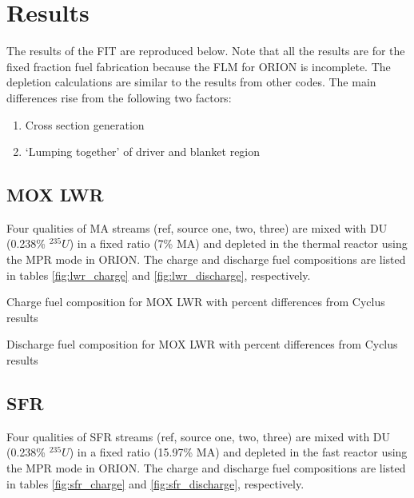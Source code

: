 \documentclass{article}
\begin{document}
\section{Results}
The results of the \gls{FIT} are reproduced below. Note that all the results are for the fixed fraction
fuel fabrication because the \gls{FLM} for ORION is incomplete. The depletion calculations are similar to the
results from other codes. The main differences rise from the following two factors:

\begin{enumerate}
    \item Cross section generation
    \item `Lumping together' of driver and blanket region
\end{enumerate}

\subsection{\gls{MOX} \gls{LWR}}
Four qualities of \gls{MA} streams (ref, source one, two, three) are mixed with 
\gls{DU} (0.238\% $^{235}U$) in a fixed ratio (7\% \gls{MA}) and depleted in the thermal reactor
using the MPR mode in ORION. The charge and discharge fuel compositions are listed in
tables \ref{fig:lwr_charge} and \ref{fig:lwr_discharge}, respectively.

\begin{table}[h]
    \centering
    \resizebox{\textwidth}{!}{
    }
    \caption{Charge fuel composition for \gls{MOX} \gls{LWR} with percent differences from
             Cyclus results}
    \label{fig:lwr_charge}
\end{table}

\begin{table}[h]
    \centering
    \resizebox{\textwidth}{!}{
    }
    \caption{Discharge fuel composition for \gls{MOX} \gls{LWR} with percent differences from
             Cyclus results}
    \label{fig:lwr_discharge}
\end{table}

\FloatBarrier

\subsection{\gls{SFR}}
Four qualities of \gls{SFR} streams (ref, source one, two, three) are mixed with
\gls{DU} (0.238\% $^{235}U$) in a fixed ratio (15.97\% \gls{MA}) and depleted in the 
fast reactor using the MPR mode in ORION. The charge and discharge fuel compositions are 
listed in tables \ref{fig:sfr_charge} and \ref{fig:sfr_discharge}, respectively.
\end{document}

